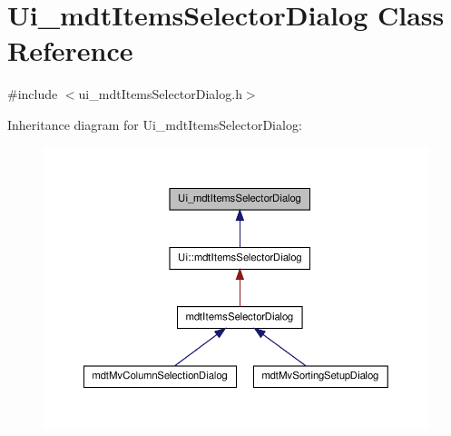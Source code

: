 \hypertarget{class_ui__mdt_items_selector_dialog}{\section{Ui\-\_\-mdt\-Items\-Selector\-Dialog Class Reference}
\label{class_ui__mdt_items_selector_dialog}
}


{\ttfamily \#include $<$ui\-\_\-mdt\-Items\-Selector\-Dialog.\-h$>$}



Inheritance diagram for Ui\-\_\-mdt\-Items\-Selector\-Dialog\-:\nopagebreak
\begin{figure}[H]
\begin{center}
\leavevmode
\includegraphics[width=350pt]{class_ui__mdt_items_selector_dialog__inherit__graph}
\end{center}
\end{figure}


